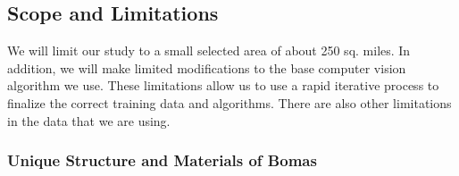 \documentclass[10pt]{article}
\begin{document}


\subsection{Scope and Limitations}

We will limit our study to a small selected area of about 250 sq. miles. In addition, we will make limited modifications to the base computer vision algorithm we use. These limitations allow us to use a rapid iterative process to finalize the correct training data and algorithms. There are also other limitations in the data that we are using.

\subsubsection{Unique Structure and Materials of Bomas}
\end{document}
